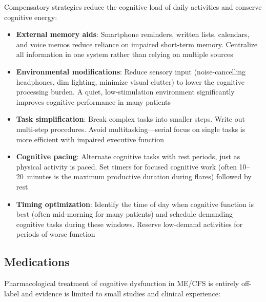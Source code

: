 Compensatory strategies reduce the cognitive load of daily activities and conserve cognitive energy:

\begin{itemize}
    \item \textbf{External memory aids}: Smartphone reminders, written lists, calendars, and voice memos reduce reliance on impaired short-term memory. Centralize all information in one system rather than relying on multiple sources
    \item \textbf{Environmental modifications}: Reduce sensory input (noise-cancelling headphones, dim lighting, minimize visual clutter) to lower the cognitive processing burden. A quiet, low-stimulation environment significantly improves cognitive performance in many patients
    \item \textbf{Task simplification}: Break complex tasks into smaller steps. Write out multi-step procedures. Avoid multitasking---serial focus on single tasks is more efficient with impaired executive function
    \item \textbf{Cognitive pacing}: Alternate cognitive tasks with rest periods, just as physical activity is paced. Set timers for focused cognitive work (often 10--20~minutes is the maximum productive duration during flares) followed by rest
    \item \textbf{Timing optimization}: Identify the time of day when cognitive function is best (often mid-morning for many patients) and schedule demanding cognitive tasks during these windows. Reserve low-demand activities for periods of worse function
\end{itemize}

\subsection{Medications}

Pharmacological treatment of cognitive dysfunction in ME/CFS is entirely off-label and evidence is limited to small studies and clinical experience:

